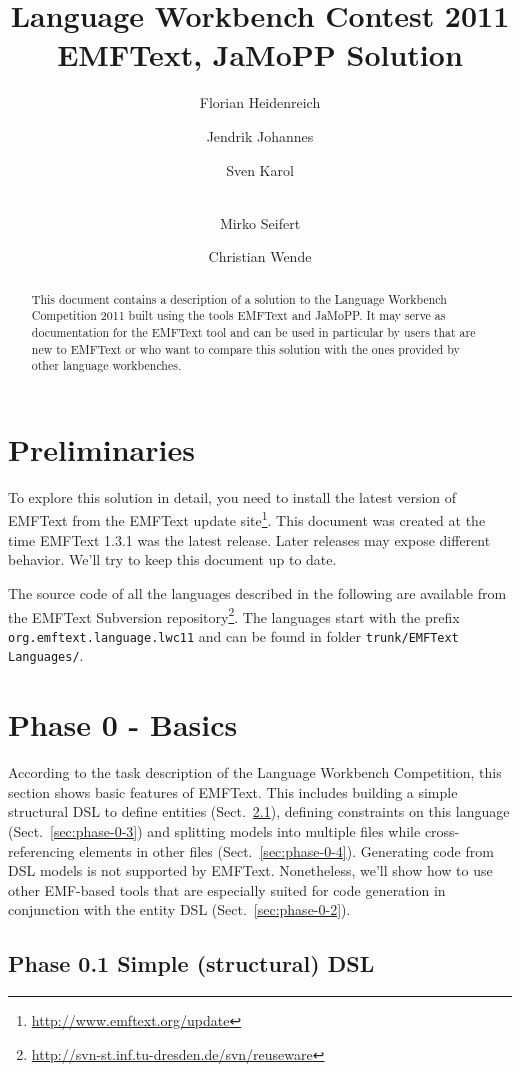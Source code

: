\documentclass[10pt, pdftex]{llncs}
\title{Language Workbench Contest 2011\\EMFText, JaMoPP Solution}
\author{Florian Heidenreich \and
  Jendrik Johannes \and
  Sven Karol \and\\
  Mirko Seifert \and
  Christian Wende}
\institute{
    Institut f\"{u}r Software- und Multimediatechnik\\
    Technische Universit\"{a}t Dresden\\
    D-01062, Dresden, Germany\\
    \email{\{florian.heidenreich,jendrik.johannes,sven.karol,\\mirko.seifert,
c.wende\}@tu-dresden.de}
    }
\begin{document}
\maketitle

\begin{abstract}
This document contains a description of a solution to the Language
Workbench Competition 2011 built using the tools EMFText and JaMoPP. It may
serve as documentation for the EMFText tool and can be used in particular by users that
are new to EMFText or who want to compare this solution with the ones provided
by other language workbenches.
\end{abstract}

\section{Preliminaries}

To explore this solution in detail, you need to install the latest version of
EMFText from the EMFText update
site\footnote{\url{http://www.emftext.org/update}}. This document was created
at the time EMFText 1.3.1 was the latest release. Later releases may expose
different behavior. We'll try to keep this document up to date.

The source code of all the languages described in the following are available
from the EMFText Subversion
repository\footnote{\url{http://svn-st.inf.tu-dresden.de/svn/reuseware}}. The
languages start with the prefix \texttt{org.emftext.language.lwc11} and can be
found in folder \texttt{trunk/EMFText Languages/}.

\section{Phase 0 - Basics}

According to the task description of the Language Workbench Competition, this
section shows basic features of EMFText. This includes building a simple
structural DSL to define entities (Sect.~\ref{sec:phase-0-1}), defining
constraints on this language (Sect.~\ref{sec:phase-0-3}) and splitting models
into multiple files while cross-referencing elements in other files
(Sect.~\ref{sec:phase-0-4}). Generating code from DSL models is not supported by
EMFText. Nonetheless, we'll show how to use other EMF-based tools that are
especially suited for code generation in conjunction with the entity DSL
(Sect.~\ref{sec:phase-0-2}).

\subsection{Phase 0.1 Simple (structural) DSL}
\label{sec:phase-0-1}
\end{document}
